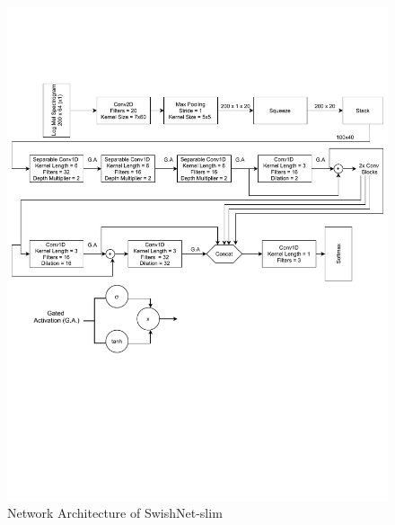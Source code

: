 \documentclass{article}
\begin{document}
\begin{figure}[!t]
	\centering
	\includegraphics[width=\textwidth, trim= 0 230 0 100, clip]{Network.pdf}
	\caption{Network Architecture of SwishNet-slim}
	\label{fig:swishnet}
\end{figure}
\end{document}
